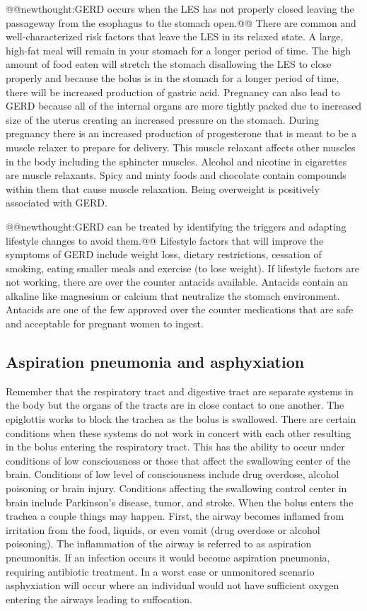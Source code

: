 \documentclass{tufte-handout}
\makeatletter
\def\newthought#1{@@newthought:#1@@}
\makeatother
\begin{document}
\newthought{GERD occurs when the LES\index{Lower Esophageal Sphincter} has not properly closed leaving the passageway from the esophagus to the stomach open.} There are common and well-characterized risk factors that leave the LES in its relaxed state. A large, high-fat meal will remain in your stomach for a longer period of time. The high amount of food eaten will stretch the stomach disallowing the LES to close properly and because the bolus is in the stomach for a longer period of time, there will be increased production of gastric acid. Pregnancy can also lead to GERD because all of the internal organs are more tightly packed due to increased size of the uterus creating an increased pressure on the stomach. During pregnancy there is an increased production of progesterone that is meant to be a muscle relaxer to prepare for delivery. This muscle relaxant affects other muscles in the body including the sphincter muscles. Alcohol and nicotine in cigarettes are muscle relaxants. Spicy and minty foods and chocolate contain compounds within them that cause muscle relaxation. Being overweight is positively associated with GERD.

\newthought{GERD can be treated by identifying the triggers and adapting lifestyle changes to avoid them.} Lifestyle factors that will improve the symptoms of GERD include weight loss, dietary restrictions, cessation of smoking, eating smaller meals and exercise (to lose weight). If lifestyle factors are not working, there are over the counter antacids available. Antacids contain an alkaline like magnesium or calcium that neutralize the stomach environment. Antacids are one of the few approved over the counter medications that are safe and acceptable for pregnant women to ingest.

\subsection{Aspiration pneumonia and asphyxiation}
Remember that the respiratory tract and digestive tract are separate systems in the body but the organs of the tracts are in close contact to one another. The epiglottis works to block the trachea as the bolus is swallowed. There are certain conditions when these systems do not work in concert with each other resulting in the bolus entering the respiratory tract. This has the ability to occur under conditions of low consciousness or those that affect the swallowing center of the brain. Conditions of low level of consciousness include drug overdose, alcohol poisoning or brain injury. Conditions affecting the swallowing control center in brain include Parkinson's disease, tumor, and stroke. When the bolus enters the trachea a couple things may happen. First, the airway becomes inflamed from irritation from the food, liquids, or even vomit (drug overdose or alcohol poisoning). The inflammation of the airway is referred to as aspiration pneumonitis. If an infection occurs it would become aspiration pneumonia, requiring antibiotic treatment. In a worst case or unmonitored scenario asphyxiation will occur where an individual would not have sufficient oxygen entering the airways leading to suffocation.  
\end{document}
